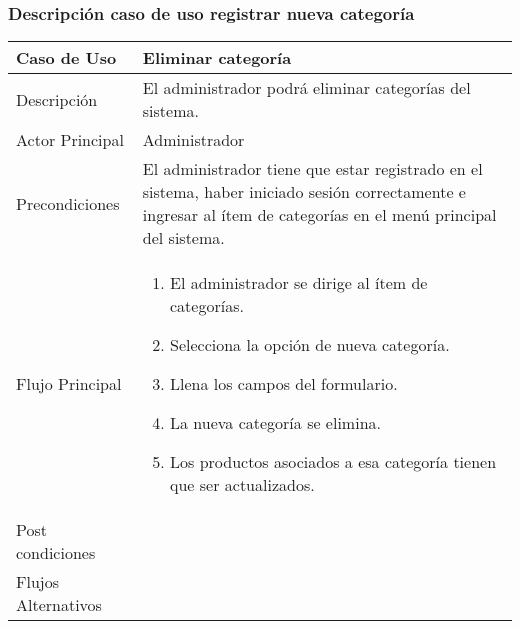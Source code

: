 \documentclass[12pt,a4paper]{article}
\begin{document}
\subsubsection*{Descripción caso de uso registrar nueva categoría}
\begin{table}[h]
        \centering
        \begin{tabular}{| p{3cm}| p{11cm} |} 
        \hline  
        Caso de Uso         &    \textbf{ Eliminar categoría}   \\ 
        \hline
        Descripción         &  El administrador podrá eliminar categorías del sistema.     \\ 
        \hline
        Actor Principal     &  Administrador    \\ 
        \hline
        Precondiciones      &  El administrador tiene que estar registrado en el sistema, haber iniciado sesión correctamente e ingresar al ítem de categorías en el menú principal del sistema.   	\\
        \hline
        Flujo Principal     &    

            \begin{enumerate}
                \item El administrador se dirige al ítem de categorías.
                \item Selecciona la opción de nueva categoría.
                \item Llena los campos del formulario.
                \item La nueva categoría se elimina.
                \item Los productos asociados a esa categoría tienen que ser actualizados.
            \end{enumerate}
        \\  
        \hline
        Post condiciones    &       \\  
        \hline
        Flujos Alternativos &       \\  
        \hline
        \end{tabular}
    \end{table}

    \newpage
\end{document}
